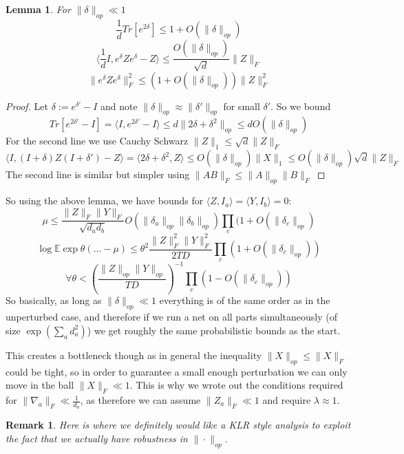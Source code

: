 \documentclass{article}
\newtheorem{lemma}[theorem]{Lemma}
\newtheorem{remark}{Remark}
\newcommand{\E}{\mathbb{E}}
\begin{document}
\begin{lemma}
For $\|\delta\|_{op} \ll 1$
\[ \frac{1}{d} Tr[e^{2\delta}] \leq 1 + O(\|\delta\|_{op})  \]
\[ \langle \frac{1}{d} I, e^{\delta} Z e^{\delta} - Z \rangle \leq \frac{O(\|\delta\|_{op})}{\sqrt{d}} \|Z\|_{F}   \]
\[ \|e^{\delta} Z e^{\delta}\|_{F}^{2} \leq (1 + O(\|\delta\|_{op})) \|Z\|_{F}^{2}   \]
\end{lemma}
\begin{proof}
Let $\delta := e^{\delta'} - I$ and note $\|\delta\|_{op} \approx \|\delta'\|_{op}$ for small $\delta'$. So we bound
\[ Tr[e^{2\delta'} - I] = \langle I, e^{2\delta'} - I \rangle \leq d \|2\delta + \delta^{2}\|_{op} \leq d O(\|\delta\|_{op})   \]
For the second line we use Cauchy Schwarz $\|Z\|_{1} \leq \sqrt{d} \|Z\|_{F}$
\[ \langle I, (I + \delta) Z (I + \delta') - Z \rangle = \langle 2 \delta + \delta^{2}, Z \rangle \leq O(\|\delta\|_{op}) \|X\|_{1} \leq O(\|\delta\|_{op}) \sqrt{d} \|Z\|_{F}  \]
The second line is similar but simpler using $\|AB\|_{F} \leq \|A\|_{op} \|B\|_{F}$
\end{proof}

So using the above lemma, we have bounds for $\langle Z, I_{a} \rangle = \langle Y, I_{b} \rangle = 0$:
\[ \mu \leq \frac{\|Z\|_{F} \|Y\|_{F}}{\sqrt{d_{a} d_{b}}} O(\|\delta_{a}\|_{op} \|\delta_{b}\|_{op}) \prod_{c} (1 + O(\|\delta_{c}\|_{op})  \]
\[ \log \E \exp \theta (... - \mu) \leq \theta^{2} \frac{\|Z\|_{F}^{2} \|Y\|_{F}^{2}}{2TD} \prod_{c} (1 + O(\|\delta_{c}\|_{op}))  \]
\[ \forall \theta < \left( \frac{\|Z\|_{op}\|Y\|_{op}}{TD} \right)^{-1} \prod_{c} (1 - O(\|\delta_{c}\|_{op}))  \]
So basically, as long as $\|\delta\|_{op} \ll 1$ everything is of the same order as in the unperturbed case, and therefore if we run a net on all parts simultaneously (of size $\exp(\sum_{a} d_{a}^{2})$) we get roughly the same probabilistic bounds as the start.

This creates a bottleneck though as in general the inequality $\|X\|_{op} \leq \|X\|_{F}$ could be tight, so in order to guarantee a small enough perturbation we can only move in the ball $\|X\|_{F} \ll 1$. This is why we wrote out the conditions required for $\|\nabla_{a}\|_{F} \ll \frac{1}{d_{a}}$, as therefore we can assume $\|Z_{a}\|_{F} \ll 1$ and require $\lambda \approx 1$.

\begin{remark}
Here is where we definitely would like a KLR style analysis to exploit the fact that we actually have robustness in $\|\cdot\|_{op}$.
\end{remark}
\end{document}
